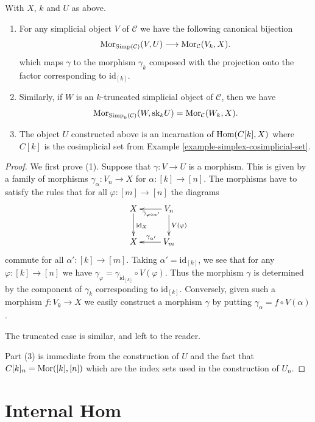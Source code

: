 \begin{lemma}
\label{lemma-morphism-into-product}
With $X$, $k$ and $U$ as above.
\begin{enumerate}
\item For any simplicial object $V$ of
$\mathcal{C}$ we have the following
canonical bijection
$$
\mathop{\mathrm{Mor}}\nolimits_{\text{Simp}(\mathcal{C})}(V, U)
\longrightarrow
\mathop{\mathrm{Mor}}\nolimits_\mathcal{C}(V_k, X).
$$
which maps $\gamma$ to the morphism $\gamma_k$ composed with
the projection onto the factor corresponding to $\text{id}_{[k]}$.
\item Similarly, if $W$ is an $k$-truncated simplicial object
of $\mathcal{C}$, then we have
$$
\mathop{\mathrm{Mor}}\nolimits_{\text{Simp}_k(\mathcal{C})}(W, \text{sk}_k U)
=
\mathop{\mathrm{Mor}}\nolimits_\mathcal{C}(W_k, X).
$$
\item The object $U$ constructed above is an
incarnation of $\mathop{\mathrm{Hom}}\nolimits(C[k], X)$ where $C[k]$ is the cosimplicial set from
Example \ref{example-simplex-cosimplicial-set}.
\end{enumerate}
\end{lemma}

\begin{proof}
We first prove (1).
Suppose that $\gamma : V \to U$ is a morphism.
This is given by a family of morphisms
$\gamma_{\alpha} : V_n \to X$ for $\alpha : [k] \to [n]$.
The morphisms have to satisfy the
rules that for all $\varphi : [m] \to [n]$ the diagrams
$$
\xymatrix{
X \ar[d]^{\text{id}_X} &
V_n \ar[d]^{V(\varphi)}
\ar[l]^{\gamma_{\varphi \circ \alpha'}} \\
X &
V_m \ar[l]_{\gamma_{\alpha'}}
}
$$
commute for all $\alpha' : [k] \to [m]$.
Taking $\alpha' = \text{id}_{[k]}$, we see that
for any $\varphi : [k] \to [n]$ we have $\gamma_\varphi =
\gamma_{\text{id}_{[k]}} \circ V(\varphi)$. Thus the morphism
$\gamma$ is determined by the component of $\gamma_k$
corresponding to $\text{id}_{[k]}$. Conversely,
given such a morphism $f : V_k \to X$ we easily
construct a morphism $\gamma$ by putting
$\gamma_\alpha = f \circ V(\alpha)$.

\medskip\noindent
The truncated case is similar, and left to the reader.

\medskip\noindent
Part (3) is immediate from the construction of $U$ and the
fact that $C[k]_n = \mathop{\mathrm{Mor}}\nolimits([k], [n])$ which are the index sets
used in the construction of $U_n$.
\end{proof}




\section{Internal Hom}
\label{section-internal-hom}

